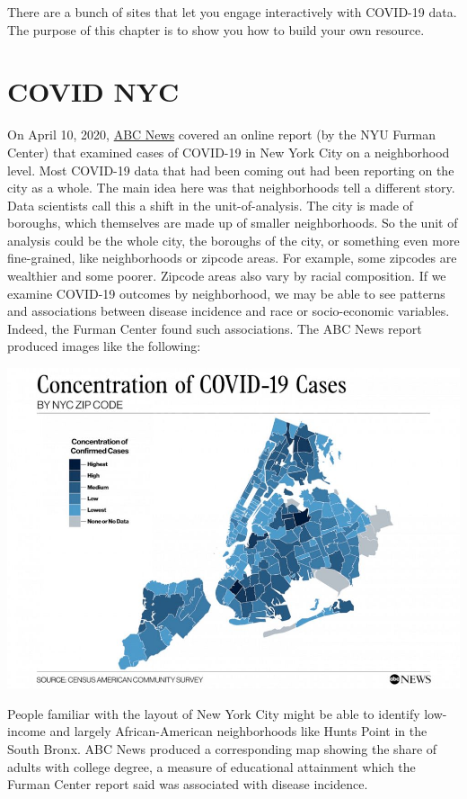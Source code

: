 \documentclass[
  openany]{book}
\begin{document}
There are a bunch of sites that let you engage interactively with COVID-19 data. The purpose of this chapter is to show you how to build your own resource.

\hypertarget{part1}{%
\section{COVID NYC}\label{part1}}

On April 10, 2020, \href{https://abcnews.go.com/Health/nyc-stark-contrast-covid-19-infection-rates-based/story?id=69920706}{ABC News} covered an online report (by the NYU Furman Center) that examined cases of COVID-19 in New York City on a neighborhood level. Most COVID-19 data that had been coming out had been reporting on the city as a whole. The main idea here was that neighborhoods tell a different story. Data scientists call this a shift in the unit-of-analysis. The city is made of boroughs, which themselves are made up of smaller neighborhoods. So the unit of analysis could be the whole city, the boroughs of the city, or something even more fine-grained, like neighborhoods or zipcode areas. For example, some zipcodes are wealthier and some poorer. Zipcode areas also vary by racial composition. If we examine COVID-19 outcomes by neighborhood, we may be able to see patterns and associations between disease incidence and race or socio-economic variables. Indeed, the Furman Center found such associations. The ABC News report produced images like the following:

\includegraphics{images/abc_COVID19NycZip_v03_KA_hpEmbed_17x12_992.jpg}

People familiar with the layout of New York City might be able to identify low-income and largely African-American neighborhoods like Hunts Point in the South Bronx. ABC News produced a corresponding map showing the share of adults with college degree, a measure of educational attainment which the Furman Center report said was associated with disease incidence.
\end{document}
